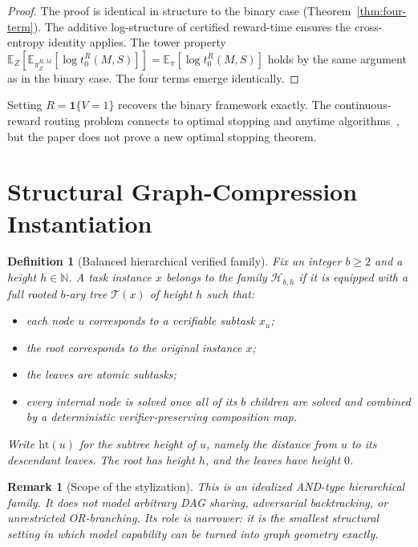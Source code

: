 \documentclass[10pt]{article}
\theoremstyle{paperplain}
\theoremstyle{paperdefinition}
\newtheorem{definition}[theorem]{Definition}
\theoremstyle{paperremark}
\newtheorem{remark}[theorem]{Remark}
\newcommand{\E}{\mathbb{E}}
\begin{document}
\begin{proof}
The proof is identical in structure to the binary case (Theorem~\ref{thm:four-term}).
The additive log-structure of certified reward-time ensures the cross-entropy identity applies.
The tower property $\E_Z[\E_{\pi_Z^{R,M}}[\log t_0^R(M,S)]] = \E_\pi[\log t_0^R(M,S)]$ holds by the same argument as in the binary case.
The four terms emerge identically.
\end{proof}

Setting $R=\mathbf 1\{V=1\}$ recovers the binary framework exactly. The continuous-reward routing problem connects to optimal stopping and anytime algorithms~\cite{weitzman1979,zilberstein_1996_anytime_systems}, but the paper does not prove a new optimal stopping theorem.

\section{Structural Graph-Compression Instantiation}
\label{app:structural-compression}

\begin{definition}[Balanced hierarchical verified family]
\label{def:hierarchical-family}
Fix an integer $b\ge 2$ and a height $h\in\mathbb N$.
A task instance $x$ belongs to the family $\mathcal H_{b,h}$ if it is equipped with a full rooted $b$-ary tree $\mathcal T(x)$ of height $h$ such that:
\begin{itemize}
\item each node $u$ corresponds to a verifiable subtask $x_u$;
\item the root corresponds to the original instance $x$;
\item the leaves are atomic subtasks;
\item every internal node is solved once all of its $b$ children are solved and combined by a deterministic verifier-preserving composition map.
\end{itemize}
Write $\mathrm{ht}(u)$ for the subtree height of $u$, namely the distance from $u$ to its descendant leaves.
The root has height $h$, and the leaves have height $0$.
\end{definition}

\begin{remark}[Scope of the stylization]
This is an idealized AND-type hierarchical family.
It does not model arbitrary DAG sharing, adversarial backtracking, or unrestricted OR-branching.
Its role is narrower: it is the smallest structural setting in which model capability can be turned into graph geometry exactly.
\end{remark}
\end{document}
